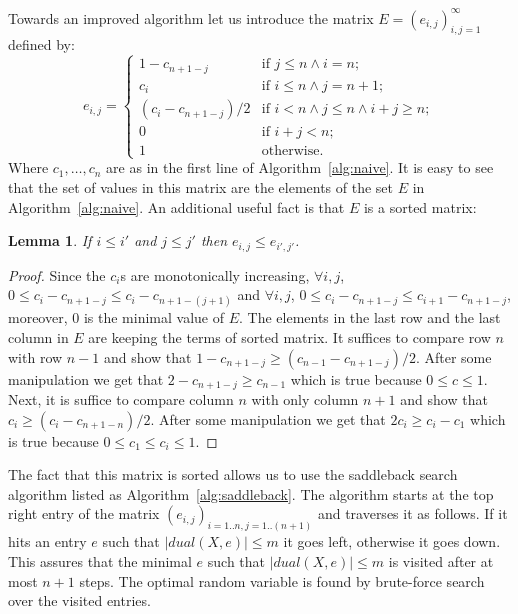 \documentclass[letterpaper]{article} %
\newtheorem{lemma}[thm]{Lemma}
\begin{document}
Towards an improved algorithm let us introduce the matrix $E=(e_{i,j})_{i,j=1}^\infty$ defined by:
	$$e_{i,j} = \begin{cases}
	1-c_{n+1-j}   & \text{if } j \leq n \wedge  i = n ; \\
	c_i & \text{if } i \leq n \wedge  j = n + 1; \\
	( c_i - c_{n+1-j})/2  & \text{if } i < n \wedge j \leq n \wedge i{+}j\geq n; \\
	0  & \text{if }  i{+}j < n; \\
	1  & \text{otherwise}.
	\end{cases}$$
Where $c_1,\dots,c_n$ are as in the first line of Algorithm~\ref{alg:naive}. It is easy to see that the set of values in this matrix are the elements of the set $E$ in Algorithm~\ref{alg:naive}. An additional useful fact is that $E$ is a sorted matrix:
\begin{lemma}\label{the:sortedMatrix}
	If $i\leq i'$ and $j\leq j'$ then $e_{i,j}\leq e_{i',j'}$.
\end{lemma}
\begin{proof}
Since the $c_i$s are monotonically increasing, $\forall i,j$, $ 0\leq c_i - c_{n+1-j}\leq c_i - c_{n+1-(j+1)} $ and $ \forall i,j$, $0 \leq c_i - c_{n+1-j}\leq c_{i+1} - c_{n+1-j} $, moreover, 0 is the minimal value of $E$. The elements in the last row and the last column in $E$ are keeping the terms of sorted matrix. It suffices to compare row $n$ with row $n-1$ and show that $1-c_{n+1-j}\geq ( c_{n-1} - c_{n+1-j})/2$. After some manipulation we get that $2-c_{n+1-j}\geq c_{n-1}$ which is true because $0 \leq c\leq 1$. Next, it is suffice to compare column $n$ with only column $n+1$ and show that $c_i\geq ( c_{i} - c_{n+1-n})/2$. After some manipulation we get that $2c_i\geq c_{i}-c_1$ which is true because $0 \leq c_1 \leq c_i\leq 1$.
\end{proof}

The fact that this matrix is sorted allows us to use the saddleback search algorithm listed as Algorithm~\ref{alg:saddleback}. The algorithm starts at the top right entry of the matrix $(e_{i,j})_{i=1..n,j=1..(n+1)}$ and traverses it as follows. If it hits an entry $e$ such that $|dual(X,e)| \leq m$ it goes left, otherwise it goes down. This assures that the minimal $e$ such that $|dual(X,e)| \leq m$ is visited after at most $n+1$ steps. The optimal random variable is found by brute-force search over the visited entries.
\end{document}
